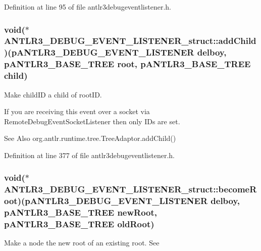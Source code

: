 Definition at line 95 of file antlr3debugeventlistener.\-h.

\hypertarget{struct_a_n_t_l_r3___d_e_b_u_g___e_v_e_n_t___l_i_s_t_e_n_e_r__struct_acc676073bc55a9df74ccc4891f8f9ef5}{
\subsubsection[{add\-Child}]{\setlength{\rightskip}{0pt plus 5cm}void($\ast$ A\-N\-T\-L\-R3\-\_\-\-D\-E\-B\-U\-G\-\_\-\-E\-V\-E\-N\-T\-\_\-\-L\-I\-S\-T\-E\-N\-E\-R\-\_\-struct\-::add\-Child)({\bf p\-A\-N\-T\-L\-R3\-\_\-\-D\-E\-B\-U\-G\-\_\-\-E\-V\-E\-N\-T\-\_\-\-L\-I\-S\-T\-E\-N\-E\-R} delboy, {\bf p\-A\-N\-T\-L\-R3\-\_\-\-B\-A\-S\-E\-\_\-\-T\-R\-E\-E} root, {\bf p\-A\-N\-T\-L\-R3\-\_\-\-B\-A\-S\-E\-\_\-\-T\-R\-E\-E} child)}}\label{struct_a_n_t_l_r3___d_e_b_u_g___e_v_e_n_t___l_i_s_t_e_n_e_r__struct_acc676073bc55a9df74ccc4891f8f9ef5}
Make child\-I\-D a child of root\-I\-D.

If you are receiving this event over a socket via Remote\-Debug\-Event\-Socket\-Listener then only I\-Ds are set.

\begin{DoxySeeAlso}{See Also}
org.\-antlr.\-runtime.\-tree.\-Tree\-Adaptor.\-add\-Child() 
\end{DoxySeeAlso}


Definition at line 377 of file antlr3debugeventlistener.\-h.

\hypertarget{struct_a_n_t_l_r3___d_e_b_u_g___e_v_e_n_t___l_i_s_t_e_n_e_r__struct_a4d2a09f0735305b7778615dcbc62073d}{
\subsubsection[{become\-Root}]{\setlength{\rightskip}{0pt plus 5cm}void($\ast$ A\-N\-T\-L\-R3\-\_\-\-D\-E\-B\-U\-G\-\_\-\-E\-V\-E\-N\-T\-\_\-\-L\-I\-S\-T\-E\-N\-E\-R\-\_\-struct\-::become\-Root)({\bf p\-A\-N\-T\-L\-R3\-\_\-\-D\-E\-B\-U\-G\-\_\-\-E\-V\-E\-N\-T\-\_\-\-L\-I\-S\-T\-E\-N\-E\-R} delboy, {\bf p\-A\-N\-T\-L\-R3\-\_\-\-B\-A\-S\-E\-\_\-\-T\-R\-E\-E} new\-Root, {\bf p\-A\-N\-T\-L\-R3\-\_\-\-B\-A\-S\-E\-\_\-\-T\-R\-E\-E} old\-Root)}}\label{struct_a_n_t_l_r3___d_e_b_u_g___e_v_e_n_t___l_i_s_t_e_n_e_r__struct_a4d2a09f0735305b7778615dcbc62073d}
Make a node the new root of an existing root. See

